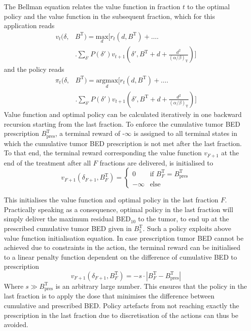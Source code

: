 \documentclass[\relativeRoot/ada.tex]{subfiles}
\begin{document}
The Bellman equation relates the value function in fraction $t$ to the optimal policy and the value function in the subsequent fraction, which for this application reads
\begin{equation}\label{eq:value_function}
    \begin{split}
    v_t(\delta, & B^{\text{T}}) = \underset{d}{\text{max}} \Biggr[
    r_t(d, B^{\text{T}}) + \ldots \Biggr.\\
    & \Biggr. \sum_{\delta'}P(\delta')v_{t+1}(\delta', B^{\text{T}} + d + \frac{d^2}{(\alpha / \beta)_\text{T}}) \Biggr]
    \end{split}
\end{equation}
and the policy reads
\begin{equation}\label{eq:policy_function}
    \begin{split}
    \pi_t(\delta, & B^{\text{T}}) = \underset{d}{\text{argmax}} \Biggr[
    r_t(d, B^{\text{T}}) + \ldots \Biggr.\\
    & \Biggr. \sum_{\delta'}P(\delta')v_{t+1}(\delta', B^{\text{T}} + d + \frac{d^2}{(\alpha / \beta)_\text{T}}) \Biggr]
    \end{split}
\end{equation}
Value function and optimal policy can be calculated iteratively in one backward recursion starting from the last fraction. To enforce the cumulative tumor BED prescription $B_{\text{pres}}^\text{T}$, a terminal reward of -$\infty$ is assigned to all terminal states in which the cumulative tumor BED prescription is not met after the last fraction. To that end, the terminal reward corresponding the value function $v_{F+1}$ at the end of the treatment after all $F$ fractions are delivered, is initialised to
\begin{equation*}
v_{F+1}(\delta_{F+1}, B^\text{T}_{F}) = 
\begin{cases}
0 & \text{if } B^\text{T}_F = B_{\text{pres}}^\text{T} \\
-\infty & \text{else}
\end{cases}
\end{equation*}

This initialises the value function and optimal policy in the last fraction $F$. Practically speaking as a consequence, optimal policy in the last fraction will simply deliver the maximum residual BED$_{10}$ to the tumor, to end up at the prescribed cumulative tumor BED given in $B_5^{\text{T}}$. Such a policy exploits above value function initialisation equation. In case prescription tumor BED cannot be achieved due to constraints in the action, the terminal reward can be initialised to a linear penalty function dependent on the difference of cumulative BED to prescription
\begin{equation*}
v_{F+1}(\delta_{F+1}, B^\text{T}_{F}) = 
- s \cdot \left| B^\text{T}_F - B_{\text{pres}}^\text{T} \right|
\end{equation*}
Where $s \gg B_{\text{pres}}^\text{T}$ is an arbitrary large number. This ensures that the policy in the last fraction is to apply the dose that minimises the difference between cumulative and prescribed BED. Policy artefacts from not reaching exactly the prescription in the last fraction due to discretisation of the actions can thus be avoided.
\end{document}
